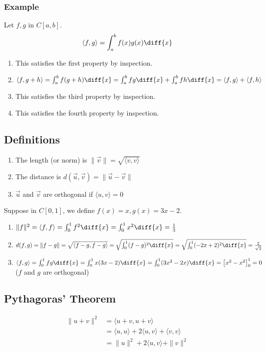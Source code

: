 \documentclass{math}
\begin{document}
\subsubsection*{Example}
Let \( f,g \) in \( C[a,b] \).
\[ \langle f,g\rangle = \int_{a}^{b}f(x)g(x)\diff{x} \]
\begin{enumerate}
  \item This satisfies the first property by inspection.
  \item \( \langle f,g+h\rangle = \int_{a}^{b}f(g+h)\diff{x} =
    \int_{a}^{b}fg\diff{x}+\int_{a}^{b}fh\diff{x} = \langle f,g\rangle+
    \langle f,h\rangle \)
  \item This satisfies the third property by inspection.
  \item This satisfies the fourth property by inspection.
\end{enumerate}

\subsection*{Definitions}
\begin{enumerate}
  \item The length (or norm) is \( \|\vec{v}\| = \sqrt{\langle v,v\rangle} \)
  \item The distance is \( d(\vec{u},\vec{v}) = \|\vec{u}-\vec{v}\| \)
  \item \( \vec{u} \) and \( \vec{v} \) are orthogonal if \( \langle u,v\rangle
    = 0 \)
\end{enumerate}
Suppose in \( C[0,1] \), we define \( f(x) = x, g(x) = 3x-2 \).
\begin{enumerate}
  \item \( \|f\|^2 = \langle f,f\rangle = \int_{0}^{1}f^2\diff{x} =
    \int_{0}^{1}x^2\diff{x} = \frac{1}{3} \)
  \item \( d(f,g) = \|f-g\| = \sqrt{\langle f-g,f-g\rangle} =
    \sqrt{\int_{0}^{1}(f-g)^2\diff{x}} = \sqrt{\int_{0}^{1}(-2x+2)^2\diff{x}} =
    \frac{2}{\sqrt{3}} \)
  \item \( \langle f,g\rangle = \int_{0}^{1}fg\diff{x} =
    \int_{0}^{1}x(3x-2)\diff{x} = \int_{0}^{1}(3x^2-2x)\diff{x} =
    \left[x^2-x^2\right]_{0}^{1} = 0 \) \\
    (\( f \) and \( g \) are orthogonal)
\end{enumerate}

\subsection*{Pythagoras' Theorem}
\begin{align*}
  \|u+v\|^2 &= \langle u+v,u+v\rangle \\
  &= \langle u,u\rangle+2\langle u,v\rangle+\langle v,v\rangle \\
  &= \|u\|^2+2\langle u,v\rangle+\|v\|^2
\end{align*}
\end{document}
